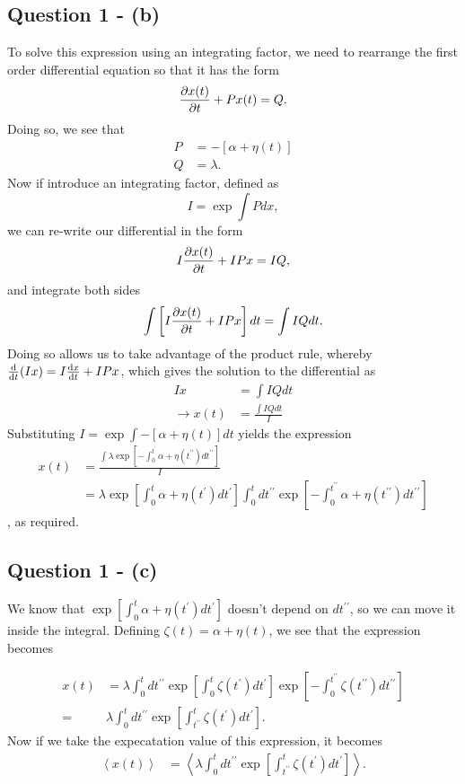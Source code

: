\documentclass[11pt,a4paper]{article}
\begin{document}
\subsection{Question 1 - (b)}
\label{sec:question1:subsec:partb}
To solve this expression using an integrating factor, we need to rearrange the first order differential equation  so that it has the form 
$$ \pdv{x(t)}{t} + P x(t) = Q .$$
Doing so, we see that 
\begin{align*}
  P &= -[\alpha + \eta(t)] \\
  Q &= \lambda .
\end{align*}
Now if introduce an integrating factor, defined as 
\begin{equation}\label{eq:integ_factor}
  I = \exp{\int P dx},
\end{equation}
we can re-write our differential in the form 
$$I \pdv{x(t)}{t} + I P x = I Q, $$
and integrate both sides
$$\int \left[I \pdv{x(t)}{t} + I P x\right] dt = \int I Q dt . $$
Doing so allows us to take advantage of the product rule, whereby $\dv{t}(I x) = I \dv{x}{t} + I P x   $, which gives the solution to the differential as 
\begin{align*}
  I x & = \int I Q dt \\
  \rightarrow x(t) & = \frac{\int I Q dt}{I}
\end{align*}
Substituting $I = \exp{\int -[\alpha  + \eta(t)] dt}$ yields the expression 
\begin{align*}
  x(t) &= \frac{\int \lambda \exp[- \int_0^{t^\prime} \alpha + \eta(t^{\prime \prime}) dt^{\prime \prime} ]}{I} \\
  &= \lambda \exp[ \int_0^{t} \alpha + \eta(t^{\prime}) dt^{\prime} ]\int_0^t dt^{\prime \prime} \exp[- \int_0^{t^{\prime \prime}} \alpha + \eta(t^{\prime \prime}) dt^{\prime \prime} ] 
\end{align*}
, as required.

\subsection{Question 1 - (c)}
\label{sec:question1:subsec:partc}
We know that $\exp[\int_0^t \alpha + \eta(t^\prime) dt^\prime] $ doesn't depend on $dt^{\prime \prime}$, so we can move it inside the integral. Defining $\zeta (t) = \alpha + \eta(t)$, we see that the expression becomes

\begin{align*} 
x(t)  & =  \lambda \int_0^t dt^{\prime \prime}\exp[ \int_0^{t} \zeta(t^\prime) dt^{\prime} ] \exp[- \int_0^{t^{\prime \prime}} \zeta(t^{\prime \prime}) dt^{\prime \prime} ] \\
 = & \lambda \int_0^t dt^{\prime \prime}\exp[ \int_{t^{\prime \prime}}^{t} \zeta(t^\prime) dt^{\prime} ] .
\end{align*}
Now if we take the expecatation value of this expression, it becomes
\begin{align*}
 \left< x (t) \right> &=  \left<{\lambda \int_0^t dt^{\prime \prime}\exp[ \int_{t^{\prime \prime}}^{t} \zeta(t^\prime) dt^{\prime} ]} \right> . 
\end{align*}
\end{document}
